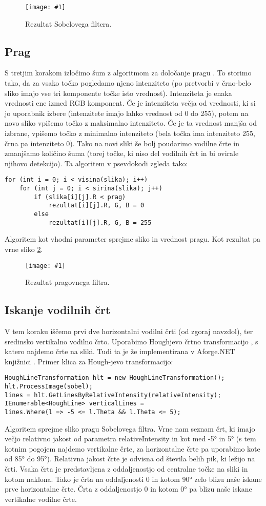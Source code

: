 \documentclass[oneside, a4paper, 12pt]{book}
\newcommand{\slika}[3]{
	\begin{figure}
	\begin{center}
	\texttt{[image: \#1]}
	\end{center}
	\vspace{-20pt}
	\caption{#2}
	\label{#3}
	\end{figure}
}
\begin{document}
\slika{slike/sobel.jpg}{Rezultat Sobelovega filtera.}{pic:sobel}

\subsection{Prag}
S tretjim korakom izločimo šum z algoritmom za določanje pragu \cite{treshold-wiki}. To storimo tako, da za vsako točko pogledamo njeno intenziteto (po pretvorbi v črno-belo sliko imajo vse tri komponente točke isto vrednost). Intenziteta je enaka vrednosti ene izmed RGB komponent. Če je intenziteta večja od vrednosti, ki si jo uporabnik izbere (intenzitete imajo lahko vrednost od 0 do 255), potem na novo sliko vpišemo točko z maksimalno intenziteto. Če je ta vrednost manjša od izbrane, vpišemo točko z minimalno intenziteto (bela točka ima intenziteto 255, črna pa intenziteto 0). Tako na novi sliki še bolj poudarimo vodilne črte in zmanjšamo količino šuma (torej točke, ki niso del vodilnih črt in bi ovirale njihovo detekcijo). Ta algoritem v psevdokodi zgleda tako:
\begin{samepage}
\begin{verbatim}
for (int i = 0; i < visina(slika); i++)
    for (int j = 0; i < sirina(slika); j++)
        if (slika[i][j].R < prag)
            rezultat[i][j].R, G, B = 0
        else
            rezultat[i][j].R, G, B = 255
\end{verbatim}
\end{samepage}
Algoritem kot vhodni parameter sprejme sliko in vrednost pragu. Kot rezultat pa vrne sliko \ref{pic:treshold}.

\slika{slike/treshold.jpg}{Rezultat pragovnega filtra.}{pic:treshold}


\subsection{Iskanje vodilnih črt}
V tem koraku iščemo prvi dve horizontalni vodilni črti (od zgoraj navzdol), ter sredinsko vertikalno vodilno črto. Uporabimo Houghjevo črtno transformacijo \cite{hough-wiki}, s katero najdemo črte na sliki. Tudi ta je že implementirana v Aforge.NET knjižnici \cite{hough}. Primer klica za Hough-jevo transformacijo:
\begin{samepage}
\begin{verbatim}
HoughLineTransformation hlt = new HoughLineTransformation();
hlt.ProcessImage(sobel);
lines = hlt.GetLinesByRelativeIntensity(relativeIntensity);
IEnumerable<HoughLine> verticalLines = 
lines.Where(l => -5 <= l.Theta && l.Theta <= 5);
\end{verbatim}
\end{samepage}
Algoritem sprejme sliko pragu Sobelovega filtra. Vrne nam seznam črt, ki imajo večjo relativno jakost od parametra relativeIntensity in kot med -5° in 5° (s tem kotnim pogojem najdemo vertikalne črte, za horizontalne črte pa uporabimo kote od 85° do 95°). Relativna jakost črte je odvisna od števila belih pik, ki ležijo na črti. Vsaka črta je predstavljena z oddaljenostjo od centralne točke na sliki in kotom naklona. Tako je črta na oddaljenosti 0 in kotom 90° zelo blizu naše iskane prve horizontalne črte. Črta z oddaljenostjo 0 in kotom 0° pa blizu naše iskane vertikalne vodilne črte. \cite{hough} 
\end{document}
